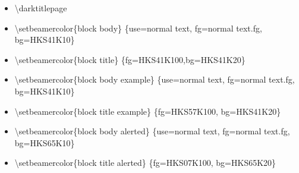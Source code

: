 \documentclass[presentation,t]{beamer}
\begin{document}
\begin{itemize}
\begin{itemize}
     text/titlepage, fg=normal text/titlepage.fg\}%
\item \textbackslash setbeamercolor\{headline/titlepage\} \{use=normal
     text/titlepage, fg=normal text/titlepage.fg\}%
\item \textbackslash setbeamercolor\{logo/titlepage\} \{use=normal
     text/titlepage, fg=normal text/titlepage.fg\}%
\item \textbackslash setbeamercolor\{einrichtung/titlepage\} \{fg=HKS92K100\}%
\item \textbackslash setbeamercolor\{fachrichtung/titlepage\}
     \{use=einrichtung/titlepage, fg=einrichtung/titlepage.fg\}%
\item \textbackslash setbeamercolor\{institut/titlepage\}
     \{use=einrichtung/titlepage, fg=einrichtung/titlepage.fg\}%
\item \textbackslash setbeamercolor\{professur/titlepage\}
     \{use=einrichtung/titlepage, fg=einrichtung/titlepage.fg\}%
\item \textbackslash setbeamercolor\{upper separation line
     head/titlepage\} \{fg=HKS92K100\}%
\item \textbackslash setbeamercolor\{lower separation line head/titlepage\}%
      \{use=upper separation line head/titlepage,fg=upper separation line
        head/titlepage.fg\}%
\item \textbackslash setbeamercolor\{date in head/foot/titlepage\} \{fg=HKS92K100\}%
\item \textbackslash let\textbackslash logo\@ DDC\textbackslash logo\@ DDC\@ bunt%
\item \textbackslash let\textbackslash logo\@ DDCf\textbackslash logo\@ DDC\@ colorf
     \}
\end{itemize}
\item \textbackslash darktitlepage

\item \textbackslash setbeamercolor\{block body\} \{use=normal text,
   fg=normal text.fg, bg=HKS41K10\}
\item \textbackslash setbeamercolor\{block title\} \{fg=HKS41K100,bg=HKS41K20\}
\item \textbackslash setbeamercolor\{block body example\} \{use=normal
   text, fg=normal text.fg, bg=HKS41K10\}
\item \textbackslash setbeamercolor\{block title example\}
   \{fg=HKS57K100, bg=HKS41K20\}
\item \textbackslash setbeamercolor\{block body alerted\} \{use=normal
   text, fg=normal text.fg, bg=HKS65K10\}
\item \textbackslash setbeamercolor\{block title alerted\}
   \{fg=HKS07K100, bg=HKS65K20\}
\end{itemize}
\end{document}
